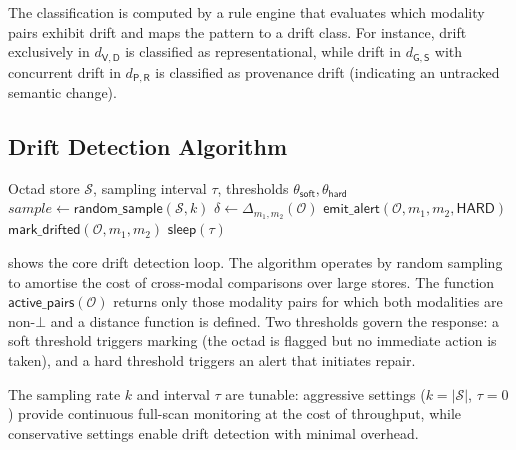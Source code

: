 \documentclass[11pt,twocolumn]{article}
\newcommand{\octad}{\mathcal{O}}
\newcommand{\driftfn}{\Delta}
\begin{document}
The classification is computed by a rule engine that evaluates which modality
pairs exhibit drift and maps the pattern to a drift class.  For instance,
drift exclusively in $d_{\mathsf{V},\mathsf{D}}$ is classified as
representational, while drift in $d_{\mathsf{G},\mathsf{S}}$ with concurrent
drift in $d_{\mathsf{P},\mathsf{R}}$ is classified as provenance drift
(indicating an untracked semantic change).

\subsection{Drift Detection Algorithm}

\begin{algorithm}[t]
\caption{Periodic Drift Detection}\label{alg:drift-detect}
\begin{algorithmic}[1]
\Require Octad store $\mathcal{S}$, sampling interval $\tau$,
  thresholds $\theta_\mathsf{soft}, \theta_\mathsf{hard}$
\Loop
  \State $\mathit{sample} \gets \mathsf{random\_sample}(\mathcal{S}, k)$
  \For{$\octad \in \mathit{sample}$}
    \For{$(m_1, m_2) \in \mathsf{active\_pairs}(\octad)$}
      \State $\delta \gets \driftfn_{m_1,m_2}(\octad)$
        \State $\mathsf{emit\_alert}(\octad, m_1, m_2, \mathsf{HARD})$
        \State $\mathsf{mark\_drifted}(\octad, m_1, m_2)$
      \EndIf
    \EndFor
  \EndFor
  \State $\mathsf{sleep}(\tau)$
\EndLoop
\end{algorithmic}
\end{algorithm}

 shows the core drift detection loop.  The algorithm
operates by random sampling to amortise the cost of cross-modal comparisons
over large stores.  The function $\mathsf{active\_pairs}(\octad)$ returns
only those modality pairs for which both modalities are non-$\bot$ and a
distance function is defined.  Two thresholds govern the response: a soft
threshold triggers marking (the octad is flagged but no immediate action is
taken), and a hard threshold triggers an alert that initiates repair.

The sampling rate $k$ and interval $\tau$ are tunable: aggressive settings
($k = |\mathcal{S}|$, $\tau = 0$) provide continuous full-scan monitoring
at the cost of throughput, while conservative settings enable drift detection
with minimal overhead.

\end{document}
